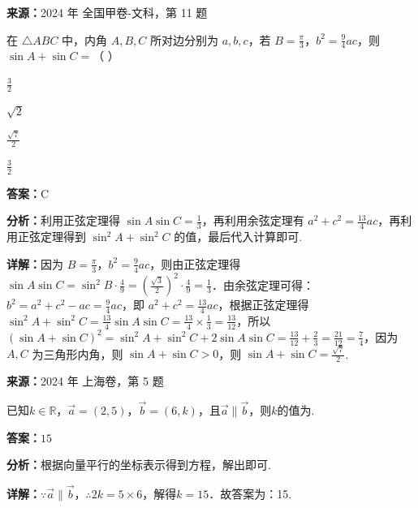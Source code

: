 \begin{question}[points=5]
\textbf{来源：}2024 年 全国甲卷-文科，第 11 题\par
在 $\triangle ABC$ 中，内角 $A, B, C$ 所对边分别为 $a, b, c$，若 $B = \frac{\pi}{3}$，$b^2 = \frac{9}{4}ac$，则 $\sin A + \sin C =$（ ）
\begin{choices}
  \item $\frac{3}{2}$
  \item $\sqrt{2}$
  \item $\frac{\sqrt{7}}{2}$
  \item $\frac{3}{2}$
\end{choices}
\begin{solution}
\textbf{答案：}C

\textbf{分析：}利用正弦定理得 $\sin A \sin C = \frac{1}{3}$，再利用余弦定理有 $a^2 + c^2 = \frac{13}{4}ac$，再利用正弦定理得到 $\sin^2 A + \sin^2 C$ 的值，最后代入计算即可.

\textbf{详解：}因为 $B = \frac{\pi}{3}$，$b^2 = \frac{9}{4}ac$，则由正弦定理得 $\sin A \sin C = \sin^2 B \cdot \frac{4}{9} = \left(\frac{\sqrt{3}}{2}\right)^2 \cdot \frac{4}{9} = \frac{1}{3}$．由余弦定理可得：$b^2 = a^2 + c^2 - ac = \frac{9}{4}ac$，即 $a^2 + c^2 = \frac{13}{4}ac$，根据正弦定理得 $\sin^2 A + \sin^2 C = \frac{13}{4} \sin A \sin C = \frac{13}{4} \times \frac{1}{3} = \frac{13}{12}$，所以 $(\sin A + \sin C)^2 = \sin^2 A + \sin^2 C + 2\sin A \sin C = \frac{13}{12} + \frac{2}{3} = \frac{21}{12} = \frac{7}{4}$，因为 $A, C$ 为三角形内角，则 $\sin A + \sin C > 0$，则 $\sin A + \sin C = \frac{\sqrt{7}}{2}$.
\end{solution}
\end{question}

\begin{question}[points=4]
\textbf{来源：}2024 年 上海卷，第 5 题\par
已知$k\in\mathbb{R}$，$\vec{a}=(2,5)$，$\vec{b}=(6,k)$，且$\vec{a}\parallel\vec{b}$，则$k$的值为.
\fillin[{$15$}]
\begin{solution}
\textbf{答案：}$15$

\textbf{分析：}根据向量平行的坐标表示得到方程，解出即可.

\textbf{详解：}$\because\vec{a}\parallel\vec{b}$，$\therefore 2k=5\times6$，解得$k=15$．故答案为：15.
\end{solution}
\end{question}

